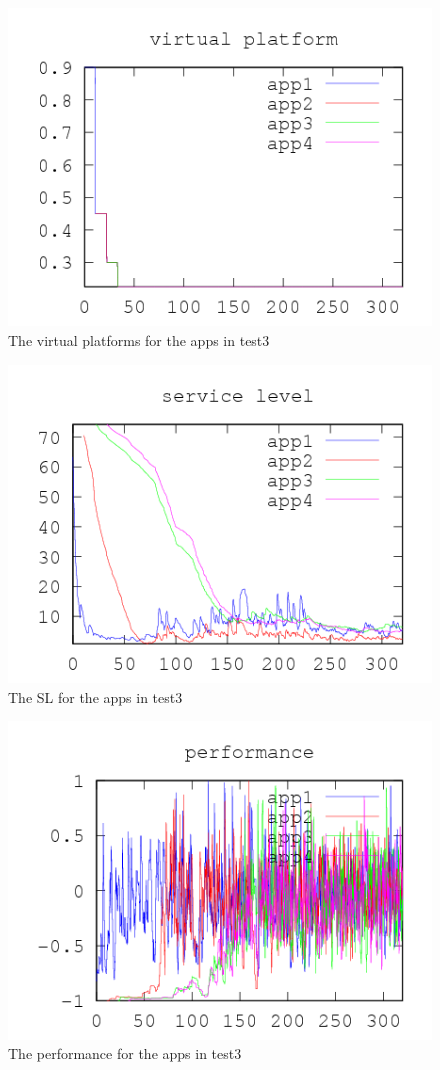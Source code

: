 \documentclass[nobiblatex]{LTHthesis}
\begin{document}
\begin{figure}[!H]
  \centering
  \includegraphics{"tools/plot/logs/test3/vp"}
  \caption{The virtual platforms for the apps in test3}
  \label{fig:test3_vp}
\end{figure}

\begin{figure}[!H]
  \centering
  \includegraphics{"tools/plot/logs/test3/sl"}
  \caption{The SL for the apps in test3}
  \label{fig:test3_sl}
\end{figure}

\begin{figure}[!H]
  \centering
  \includegraphics{"tools/plot/logs/test3/f"}
  \caption{The performance for the apps in test3}
  \label{fig:test3_f}
\end{figure}
\end{document}
